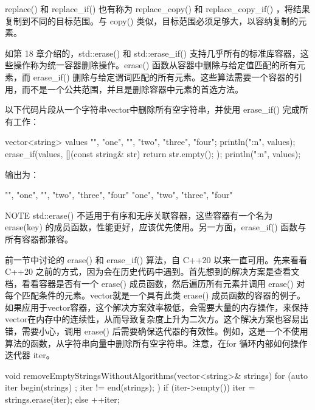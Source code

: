 replace() 和 replace\_if() 也有称为 replace\_copy() 和 replace\_copy\_if() ，将结果复制到不同的目标范围。与 copy() 类似，目标范围必须足够大，以容纳复制的元素。


如第 18 章介绍的，std::erase() 和 std::erase\_if() 支持几乎所有的标准库容器，这些操作称为统一容器删除操作。erase() 函数从容器中删除与给定值匹配的所有元素，而 erase\_if() 删除与给定谓词匹配的所有元素。这些算法需要一个容器的引用，而不是一个公共范围，并且是删除容器中元素的首选方法。

以下代码片段从一个字符串vector中删除所有空字符串，并使用 erase\_if() 完成所有工作：

\begin{cpp}
vector<string> values {"", "one", "", "two", "three", "four"};
println("{:n}", values);
erase_if(values, [](const string& str){ return str.empty(); });
println("{:n}", values);
\end{cpp}

输出为：

\begin{shell}
"", "one", "", "two", "three", "four"
"one", "two", "three", "four"
\end{shell}

\begin{myNotic}{NOTE}
std::erase() 不适用于有序和无序关联容器，这些容器有一个名为 erase(key) 的成员函数，性能更好，应该优先使用。另一方面，erase\_if() 函数与所有容器都兼容。
\end{myNotic}


前一节中讨论的 erase() 和 erase\_if() 算法，自 C++20 以来一直可用。先来看看 C++20 之前的方式，因为会在历史代码中遇到。首先想到的解决方案是查看文档，看看容器是否有一个 erase() 成员函数，然后遍历所有元素并调用 erase() 对每个匹配条件的元素。vector就是一个具有此类 erase() 成员函数的容器的例子。如果应用于vector容器，这个解决方案效率极低，会需要大量的内存操作，来保持vector在内存中的连续性，从而导致复杂度上升为二次方。这个解决方案也容易出错，需要小心，调用 erase() 后需要确保迭代器的有效性。例如，这是一个不使用算法的函数，从字符串向量中删除所有空字符串。注意，在for 循环内部如何操作迭代器 iter。

\begin{cpp}
void removeEmptyStringsWithoutAlgorithms(vector<string>& strings)
{
    for (auto iter { begin(strings) }; iter != end(strings); ) {
        if (iter->empty()) {
            iter = strings.erase(iter);
        } else {
            ++iter;
        }
    }
}
\end{cpp}

